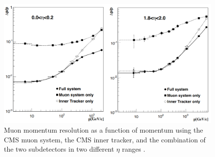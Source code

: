 \begin{figure}[hbtp]
\centering
\includegraphics[scale=0.3]{figures/lhc_and_cms/muon_momentum_resolution.png}
\caption{Muon momentum resolution as a function of momentum using the CMS muon system, the CMS inner tracker, and the combination of the two subdetectors in two different $\eta$ ranges \cite{cms_tdr_v1}.}
\label{muon_momentum_resolution}
\end{figure}